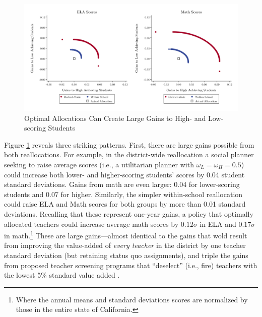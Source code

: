 \documentclass[12pt]{article}
\theoremstyle{definition}
\theoremstyle{definition}
\theoremstyle{definition}
\theoremstyle{definition}
\begin{document}
\begin{figure}[htpb]
\centering
\includegraphics[width=.9\textwidth]{Working_Paper/test_figures/03_reallocation.pdf}
    \caption{Optimal Allocations Can Create Large Gains to High- and Low-scoring Students}
    \label{fig:reallocation}
\end{figure}

Figure \ref{fig:reallocation} reveals three striking patterns. First, there are large gains possible from both reallocations. For example, in the district-wide reallocation a social planner seeking to raise average scores (i.e., a utilitarian planner with $\omega_L=\omega_H=0.5$) could increase both lower- and higher-scoring students' scores by 0.04 student standard deviations. Gains from math are even larger: 0.04 for lower-scoring students and 0.07 for higher. Similarly, the simpler within-school reallocation could raise ELA and Math scores for both groups by more than 0.01 standard deviations. Recalling that these represent one-year gains, a policy that optimally allocated teachers could increase average math scores by $0.12\sigma$ in ELA and $0.17\sigma$ in math.\footnote{Where the annual means and standard deviations scores are normalized by those in the entire state of California.} These are large gains---almost identical to the gains that wold result from improving the value-added of \textit{every teacher} in the district by one teacher standard deviation (but retaining status quo assignments), and triple the gains from proposed teacher screening programs that ``deselect'' (i.e., fire) teachers with the lowest 5\% standard value added \citep[as considered in][]{hanushek2009teacher,hanushek2011economic,chetty2014measuring2}.
\end{document}
